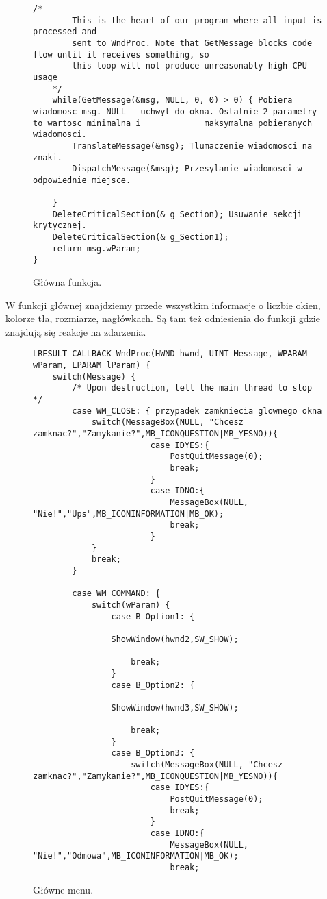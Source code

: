\documentclass[a4paper,twoside,12pt]{mgr}
\begin{document}
\begin{figure}[H]
\centering
\begin{lstlisting}[frame=single]	
	/*
		This is the heart of our program where all input is processed and 
		sent to WndProc. Note that GetMessage blocks code flow until it receives something, so
		this loop will not produce unreasonably high CPU usage
	*/
	while(GetMessage(&msg, NULL, 0, 0) > 0) { Pobiera wiadomosc msg. NULL - uchwyt do okna. Ostatnie 2 parametry to wartosc minimalna i 			maksymalna pobieranych wiadomosci. 
		TranslateMessage(&msg); Tlumaczenie wiadomosci na znaki.
		DispatchMessage(&msg); Przesylanie wiadomosci w odpowiednie miejsce.
		
	}
	DeleteCriticalSection(& g_Section); Usuwanie sekcji krytycznej.
	DeleteCriticalSection(& g_Section1);
	return msg.wParam;
}
\end{lstlisting}
\caption{Główna funkcja.}%
\label{rys:etykieta}
\end{figure}		

W funkcji głównej znajdziemy przede wszystkim informacje o liczbie okien, kolorze tła, rozmiarze, nagłówkach. Są tam też odniesienia do funkcji gdzie znajdują się reakcje na zdarzenia.

\begin{figure}[H]
\centering
\begin{lstlisting}[frame=single]	
LRESULT CALLBACK WndProc(HWND hwnd, UINT Message, WPARAM wParam, LPARAM lParam) {
	switch(Message) {
		/* Upon destruction, tell the main thread to stop */
		case WM_CLOSE: { przypadek zamkniecia glownego okna
			switch(MessageBox(NULL, "Chcesz zamknac?","Zamykanie?",MB_ICONQUESTION|MB_YESNO)){
						case IDYES:{
							PostQuitMessage(0);
							break;
						}
						case IDNO:{
							MessageBox(NULL, "Nie!","Ups",MB_ICONINFORMATION|MB_OK);
							break;
						}
			}
			break;
		}
		
		case WM_COMMAND: {
			switch(wParam) {
				case B_Option1: {
				
				ShowWindow(hwnd2,SW_SHOW);	
					
					break;
				}
				case B_Option2: {
					
				ShowWindow(hwnd3,SW_SHOW);	
				
					break;	
				}
				case B_Option3: {
					switch(MessageBox(NULL, "Chcesz zamknac?","Zamykanie?",MB_ICONQUESTION|MB_YESNO)){
						case IDYES:{
							PostQuitMessage(0);
							break;
						}
						case IDNO:{
							MessageBox(NULL, "Nie!","Odmowa",MB_ICONINFORMATION|MB_OK);
							break;
\end{lstlisting}
\caption{Główne menu.}%
\label{rys:etykieta}
\end{figure}	
\end{document}
